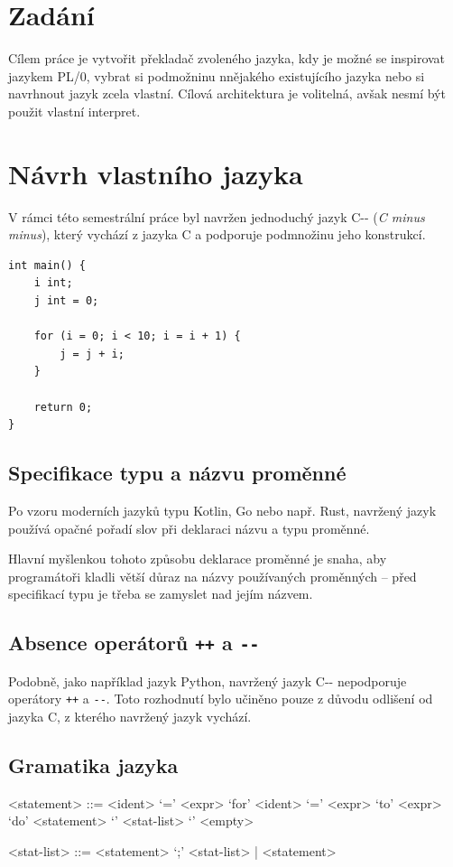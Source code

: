 \documentclass[12pt, a4paper]{article}
\let\oldsection\section
\renewcommand\section{\clearpage\oldsection}
\begin{document}
    \tableofcontents
    \pagebreak

    
\section{Zadání}

    Cílem práce je vytvořit překladač zvoleného jazyka, kdy je možné se inspirovat jazykem PL/0, vybrat si podmožninu nnějakého existujícího jazyka nebo si navrhnout jazyk zcela vlastní. Cílová architektura je volitelná, avšak nesmí být použit vlastní interpret.


\section{Návrh vlastního jazyka}

V rámci této semestrální práce byl navržen jednoduchý jazyk C-{}- (\textit{C minus minus}), který vychází z jazyka C a podporuje podmnožinu jeho konstrukcí.

\begin{lstlisting}[caption={Ukázka programu v jazyce C-{}-}, captionpos=b]
int main() {
    i int;
    j int = 0;

    for (i = 0; i < 10; i = i + 1) {
        j = j + i;
    }

    return 0;
}
\end{lstlisting}


\subsection{Specifikace typu a názvu proměnné}
Po vzoru moderních jazyků typu Kotlin, Go nebo např. Rust, navržený jazyk používá opačné pořadí slov při deklaraci názvu a typu proměnné. 

Hlavní myšlenkou tohoto způsobu deklarace proměnné je snaha, aby programátoři kladli větší důraz na názvy používaných proměnných -- před specifikací typu je třeba se zamyslet nad jejím názvem. 

\subsection{Absence operátorů \texttt{++} a \texttt{-{}-}}

Podobně, jako například jazyk Python, navržený jazyk C-{}- nepodporuje operátory \texttt{++} a \texttt{-{}-}. Toto rozhodnutí bylo učiněno pouze z důvodu odlišení od jazyka C, z kterého navržený jazyk vychází.

\subsection{Gramatika jazyka}
\begin{grammar}

<statement> ::= <ident> `=' <expr> 
\alt `for' <ident> `=' <expr> `to' <expr> `do' <statement> 
\alt `{' <stat-list> `}' 
\alt <empty> 

<stat-list> ::= <statement> `;' <stat-list> | <statement> 

\end{grammar}
\end{document}
